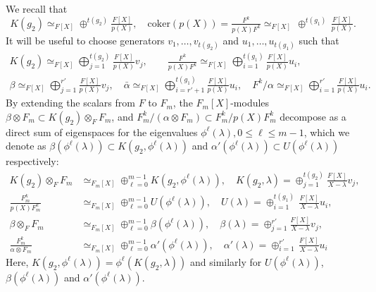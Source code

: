 \documentclass[reqno]{amsart}
\theoremstyle{definition}
\theoremstyle{remark}
\numberwithin{equation}{section}
\begin{document}
{We recall that 
\[ K(g_2) \simeq_{F[X]} \oplus^{t(g_2)} \tfrac{F[X]}{p(X)}, \quad \text{coker}(p(X))=\tfrac{F^k}{p(X) F^k} \simeq_{F[X]} \,   \oplus^{t(g_1)} \, \tfrac{F[X]}{p(X)}. \]
It will be useful to choose generators $v_1, \dots, v_{t(g_2)}$ and $u_1, \dots,u_{ t(g_1)}$ such that 
\begin{align} \label{eq:generators_Kg_2}  K(g_2)  \simeq_{F[X]} \bigoplus_{j=1}^{t(g_2)} \tfrac{F[X]}{p(X)} v_j, \qquad  \tfrac{F^k}{p(X) F^k} \simeq_{F[X]} \bigoplus_{i=1}^{t(g_1)} \tfrac{F[X]}{p(X)} u_i, \\
 \nonumber \beta  \simeq_{F[X]} \bigoplus_{j=1}^{r'} \tfrac{F[X]}{p(X)} v_j, \quad  \bar\alpha   \simeq_{F[X]} \bigoplus_{i=r'+1}^{t(g_1)} \tfrac{F[X]}{p(X)} u_i, \quad F^k/\alpha \simeq_{F[X]} \bigoplus_{i=1}^{r'} \tfrac{F[X]}{p(X)} u_i.\end{align}
By extending the scalars from $F$ to $F_m$, the $F_m[X]$-modules  $\beta \otimes F_m \subset K(g_2) \otimes_F F_m$,  and $F_m^k/(\alpha \otimes F_m) \subset F_m^k/p(X) F_m^k$ decompose as a direct sum of eigenspaces for the eigenvalues $\phi^\ell(\lambda),   0 \leq \ell \leq m-1$, which we denote as $\beta (\phi^\ell(\lambda)) \subset K(g_2, \phi^\ell(\lambda))$ and $\alpha'(\phi^\ell(\lambda)) \subset U(\phi^\ell(\lambda))$ respectively:
\begin{align*}
    K(g_2) \otimes_F F_m &\simeq_{F_m[X]} \oplus_{\ell=0}^{m-1} K(g_2, \phi^\ell(\lambda)), \quad K(g_2,\lambda) = \oplus_{j=1}^{t(g_2)} \tfrac{F[X]}{X-\lambda} v_j, \\
    \tfrac{F_m^k}{p(X) F_m^k} &\simeq_{F_m[X]} \oplus_{\ell=0}^{m-1} U(\phi^\ell(\lambda)), \quad U(\lambda)= \oplus_{i=1}^{t(g_1)} \, \tfrac{F[X]}{X-\lambda} u_i, \\
    \beta \otimes_F F_m &\simeq_{F_m[X]} \oplus_{\ell=0}^{m-1} \beta(\phi^\ell(\lambda)), \quad \beta(\lambda) = \oplus_{j=1}^{r'} \tfrac{F[X]}{X-\lambda} v_j, \\
       \tfrac{F_m^k}{\alpha \otimes F_m} &\simeq_{F_m[X]} \oplus_{\ell=0}^{m-1} \alpha'(\phi^\ell(\lambda)), \quad \alpha'(\lambda)= \oplus_{i=1}^{r'} \, \tfrac{F[X]}{X-\lambda} u_i
\end{align*}
Here, $K(g_2, \phi^\ell(\lambda))=\phi^\ell(K(g_2, \lambda))$ and similarly for $U(\phi^\ell(\lambda))$, $\beta(\phi^\ell(\lambda))$ and $\alpha'(\phi^\ell(\lambda))$.  

}
\end{document}
